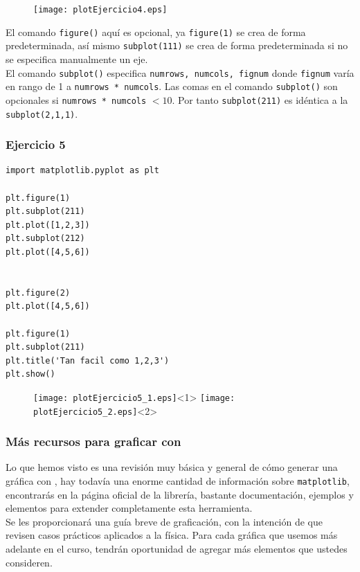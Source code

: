 \begin{frame}[fragile]
\begin{figure}
	\centering
	\texttt{[image: plotEjercicio4.eps]}
\end{figure}
\end{frame}
\begin{frame}
El comando \texttt{figure()} aquí es opcional, ya \texttt{figure(1)} se crea de forma predeterminada, así mismo \texttt{subplot(111)} se crea de forma predeterminada si no se especifica manualmente un eje.
\\
\medskip
El comando \texttt{subplot()} especifica \texttt{numrows, numcols, fignum} donde \texttt{fignum} varía en rango de 1 a \texttt{numrows * numcols}. Las comas en el comando \texttt{subplot()} son opcionales si \texttt{numrows * numcols} $<10$. Por tanto \texttt{subplot(211)} es idéntica a la \texttt{subplot(2,1,1)}.
\end{frame}
\begin{frame}[fragile]
\frametitle{Ejercicio 5}
\begin{lstlisting}
import matplotlib.pyplot as plt

plt.figure(1)                
plt.subplot(211)         
plt.plot([1,2,3])
plt.subplot(212)         
plt.plot([4,5,6])


plt.figure(2)                
plt.plot([4,5,6])           

plt.figure(1)                
plt.subplot(211)         
plt.title('Tan facil como 1,2,3')
plt.show()
\end{lstlisting}
\end{frame}
\begin{frame}[fragile]
\begin{figure}
	\centering
	\texttt{[image: plotEjercicio5\_1.eps]}<1>
	\texttt{[image: plotEjercicio5\_2.eps]}<2>
\end{figure}
\end{frame}
\begin{frame}
\frametitle{Más recursos para graficar con \python}
Lo que hemos visto es una revisión muy básica y general de cómo generar una gráfica con \python, hay todavía una enorme cantidad de información sobre \texttt{matplotlib}, encontrarás en la página oficial de la librería, bastante documentación, ejemplos y elementos para extender completamente esta herramienta.
\\
\medskip
\pause
Se les proporcionará una guía breve de graficación, con la intención de que revisen casos prácticos aplicados a la física. Para cada gráfica que usemos más adelante en el curso, tendrán oportunidad de agregar más elementos que ustedes consideren.
\end{frame}
